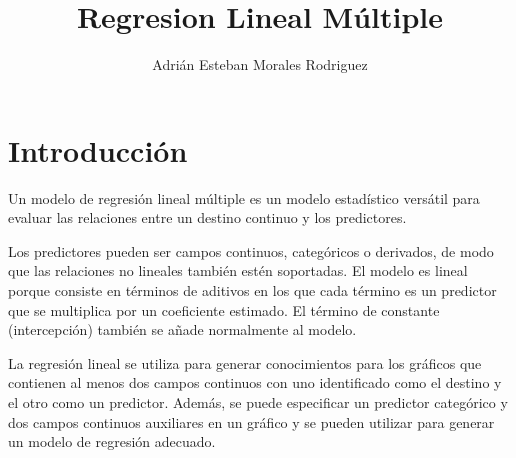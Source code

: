 \documentclass{article}
\title{Regresion Lineal Múltiple}
\author{Adrián Esteban Morales Rodriguez}
\begin{document}
\maketitle

\section{Introducción}

Un modelo de regresión lineal múltiple es un modelo estadístico versátil para evaluar las relaciones entre un destino continuo y los predictores.

Los predictores pueden ser campos continuos, categóricos o derivados, de modo que las relaciones no lineales también estén soportadas. El modelo es lineal porque consiste en términos de aditivos en los que cada término es un predictor que se multiplica por un coeficiente estimado. El término de constante (intercepción) también se añade normalmente al modelo.

La regresión lineal se utiliza para generar conocimientos para los gráficos que contienen al menos dos campos continuos con uno identificado como el destino y el otro como un predictor. Además, se puede especificar un predictor categórico y dos campos continuos auxiliares en un gráfico y se pueden utilizar para generar un modelo de regresión adecuado.
\end{document}
